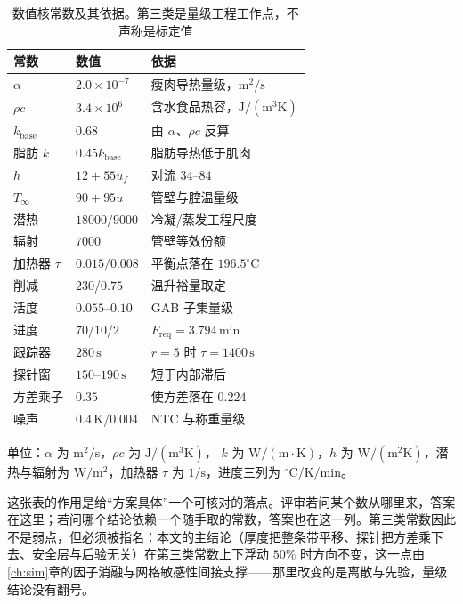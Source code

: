 \begin{table}[htbp]
\centering
\caption{数值核常数及其依据。第三类是量级工程工作点，不声称是标定值}
\label{tab:params}
\setlength{\tabcolsep}{2.2pt}
{\footnotesize
\begin{tabular}{@{}l l >{\raggedright\arraybackslash}p{2.6cm}@{}}
\toprule
常数 & 数值 & 依据 \\
\midrule
\(\alpha\) & \(2.0\!\times\!10^{-7}\) & 瘦肉导热量级，\(\mathrm{m^2/s}\) \\
\(\rho c\) & \(3.4\!\times\!10^{6}\) & 含水食品热容，\(\mathrm{J/(m^3K)}\) \\
\(k_{\mathrm{base}}\) & \(0.68\) & 由 \(\alpha\)、\(\rho c\) 反算 \\
脂肪 \(k\) & \(0.45k_{\mathrm{base}}\) & 脂肪导热低于肌肉 \\
\(h\) & \(12+55u_f\) & 对流 \(34\)--\(84\) \\
\(T_\infty\) & \(90+95u\) & 管壁与腔温量级 \\
潜热 & \(18000/9000\) & 冷凝/蒸发工程尺度 \\
辐射 & \(7000\) & 管壁等效份额 \\
加热器 \(\tau\) & \(0.015/0.008\) & 平衡点落在 \(196.5^\circ\mathrm{C}\) \\
削减 & \(230\)/\(0.75\) & 温升裕量取定 \\
活度 & \(0.055\)--\(0.10\) & GAB 子集量级 \\
进度 & \(70\)/\(10\)/\(2\) & \(F_{\mathrm{req}}=3.794\,\mathrm{min}\) \\
跟踪器 & \(280\,\mathrm{s}\) & \(r=5\) 时 \(\tau=1400\,\mathrm{s}\) \\
探针窗 & \(150\)--\(190\,\mathrm{s}\) & 短于内部滞后 \\
方差乘子 & \(0.35\) & 使方差落在 \(0.224\) \\
噪声 & \(0.4\,\mathrm{K}\)/\(0.004\) & NTC 与称重量级 \\
\bottomrule
\end{tabular}}

\vspace{2pt}
{\scriptsize 单位：\(\alpha\) 为 \(\mathrm{m^2/s}\)，\(\rho c\) 为 \(\mathrm{J/(m^3K)}\)，
\(k\) 为 \(\mathrm{W/(m\cdot K)}\)，\(h\) 为 \(\mathrm{W/(m^2K)}\)，潜热与辐射为
\(\mathrm{W/m^2}\)，加热器 \(\tau\) 为 \(1/\mathrm{s}\)，进度三列为
\(^\circ\mathrm{C}\)/\(\mathrm{K}\)/\(\mathrm{min}\)。}
\end{table}

这张表的作用是给“方案具体”一个可核对的落点。评审若问某个数从哪里来，答案在这里；若问哪个结论依赖一个随手取的常数，答案也在这一列。第三类常数因此不是弱点，但必须被指名：本文的主结论（厚度把整条带平移、探针把方差乘下去、安全层与后验无关）在第三类常数上下浮动 \(50\%\) 时方向不变，这一点由\ref{ch:sim}{}章的因子消融与网格敏感性间接支撑——那里改变的是离散与先验，量级结论没有翻号。

